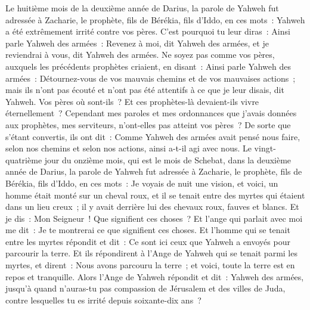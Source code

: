 \begin{multicols}{2}
\VerseOne{}Le huitième mois de la deuxième année de Darius, la parole de Yahweh fut adressée à Zacharie, le prophète, fils de Bérékia, fils d'Iddo, en ces mots~:
Yahweh a été extrêmement irrité contre vos pères.
C'est pourquoi tu leur diras~: Ainsi parle Yahweh des armées~: Revenez à moi, dit Yahweh des armées, et je reviendrai à vous, dit Yahweh des armées.
Ne soyez pas comme vos pères, auxquels les précédents prophètes criaient, en disant~: Ainsi parle Yahweh des armées~: Détournez-vous de vos mauvais chemins et de vos mauvaises actions~; mais ils n'ont pas écouté et n'ont pas été attentifs à ce que je leur disais, dit Yahweh.
Vos pères où sont-ils~? Et ces prophètes-là devaient-ils vivre éternellement~?
Cependant mes paroles et mes ordonnances que j'avais données aux prophètes, mes serviteurs, n'ont-elles pas atteint vos pères~? De sorte que s'étant convertis, ils ont dit~: Comme Yahweh des armées avait pensé nous faire, selon nos chemins et selon nos actions, ainsi a-t-il agi avec nous.
Le vingt-quatrième jour du onzième mois, qui est le mois de Schebat, dans la deuxième année de Darius, la parole de Yahweh fut adressée à Zacharie, le prophète, fils de Bérékia, fils d'Iddo, en ces mots~:
Je voyais de nuit une vision, et voici, un homme était monté sur un cheval roux, et il se tenait entre des myrtes qui étaient dans un lieu creux~; il y avait derrière lui des chevaux roux, fauves et blancs.
Et je dis~: Mon Seigneur~! Que signifient ces choses~? Et l'ange qui parlait avec moi me dit~: Je te montrerai ce que signifient ces choses.
Et l'homme qui se tenait entre les myrtes répondit et dit~: Ce sont ici ceux que Yahweh a envoyés pour parcourir la terre.
Et ils répondirent à l'Ange de Yahweh qui se tenait parmi les myrtes, et dirent~: Nous avons parcouru la terre~; et voici, toute la terre est en repos et tranquille.
Alors l'Ange de Yahweh répondit et dit~: Yahweh des armées, jusqu'à quand n'auras-tu pas compassion de Jérusalem et des villes de Juda, contre lesquelles tu es irrité depuis soixante-dix ans~?

\end{multicols}

